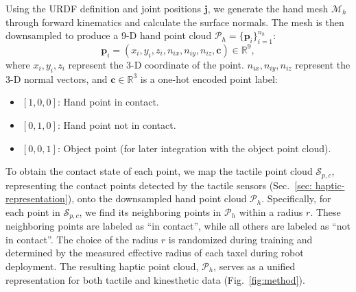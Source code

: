 \documentclass[11pt, a4paper, logo, twocolumn]{brown}
\begin{document}
Using the URDF definition and joint positions $\mathbf{j}$, we generate the hand mesh $\mathcal{M}_h$ through forward kinematics and calculate the surface normals. The mesh is then downsampled to produce a 9-D hand point cloud $\mathcal{P}_h = \{ \mathbf{p}_i \}_{i=1}^{n_h}$:
\begin{equation}
\label{eqn: 9d-definition}
    \mathbf{p}_i = (x_i, y_i, z_i, n_{ix}, n_{iy}, n_{iz}, \mathbf{c}) \in \mathbb{R}^9,
\end{equation}
where $x_i, y_i, z_i$ represent the 3-D coordinate of the point. 
$n_{ix}, n_{iy}, n_{iz}$ represent the 3-D normal vectors,
and $\mathbf{c} \in \mathbb{R}^3$ is a one-hot encoded point label:
\begin{itemize}
    \item $[1, 0, 0]$: Hand point in contact.
    \item $[0, 1, 0]$: Hand point not in contact.
    \item $[0, 0, 1]$: Object point (for later integration with the object point cloud).
\end{itemize} 
To obtain the contact state of each point, we map the tactile point cloud $\mathcal{S}_{p, c}$, representing the contact points detected by the tactile sensors (Sec.~\ref{sec: haptic-representation}), onto the downsampled hand point cloud $\mathcal{P}_h$. 
Specifically, for each point in $\mathcal{S}_{p, c}$, we find its neighboring points in $\mathcal{P}_h$ within a radius $r$.
These neighboring points are labeled as ``in contact'', while all others are labeled as ``not in contact''.
The choice of the radius $r$ is randomized during training and determined by the measured effective radius of each taxel during robot deployment. 
The resulting haptic point cloud, $\mathcal{P}_h$, serves as a unified representation for both tactile and kinesthetic data (Fig.~\ref{fig:method}). 
\end{document}
